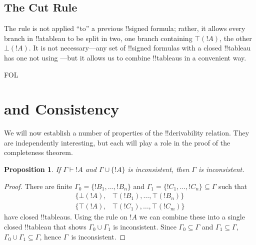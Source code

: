 \documentclass[10pt,a4paper]{article}
\theoremstyle{plain}
\newtheorem{prop}[thm]{Proposition}
\theoremstyle{definition}
\theoremstyle{remark}
\newcommand*{\olfileid}[3]{}
\newcommand*{\olsection}[1]{\section*{#1}}
\newcommand*{\ollabel}[1]{\label{#1}}
\providecommand{\AxiomC}[1]{}
\providecommand{\UnaryInfC}[1]{}
\providecommand{\RightLabel}[1]{}
\providecommand{\noLine}{}
\providecommand{\DisplayProof}{}
\providecommand{\lif}{\mathbin{\rightarrow}}
\providecommand{\Proves}{\mathrel{\vdash}}
\providecommand{\sFmla}[2]{#1(#2)}
\providecommand{\True}{\top}
\providecommand{\False}{\bot}
\providecommand{\iftag}[1]{#1}
\providecommand{\TRule}[1]{}
\providecommand{\Cut}{\mathrm{Cut}}
\begin{document}
\begin{defish}
\AxiomC{\sFmla{\True}{!A \lif !B}}
\RightLabel{\TRule{\True}{\lif}}
\UnaryInfC{$\sFmla{\False}{!A} \quad \mid \quad \sFmla{\True}{!B}$}
\DisplayProof
\hfill
\AxiomC{\sFmla{\False}{!A \lif !B}}
\RightLabel{\TRule{\False}{\lif}}
\UnaryInfC{\sFmla{\True}{!A}}
\noLine
\UnaryInfC{\sFmla{\False}{!B}}
\DisplayProof
\end{defish}

\subsection{The Cut Rule}

\begin{defish}
\AxiomC{}
\RightLabel{\Cut}
\UnaryInfC{$\sFmla{\True}{!A} \quad \mid \quad \sFmla{\False}{!A}$}
\DisplayProof
\end{defish}

The \Cut{} rule is not applied ``to'' a previous !!{signed formula}; rather,
it allows every branch in !!a{tableau} to be split in two, one branch
containing $\sFmla{\True}{!A}$, the other~$\sFmla{\False}{!A}$. It is
not necessary---any set of !!{signed formula}s with a closed
!!{tableau} has one not using \Cut---but it allows us to combine
!!{tableau}s in a convenient way.





\iftag{FOL}
      {\olfileid{fol}{tab}{prv}}
      {\olfileid{pl}{tab}{prv}}

\olsection{ and Consistency}

We will now establish a number of properties of the !!{derivability}
relation.  They are independently interesting, but each will play a
role in the proof of the completeness theorem.

\begin{prop}\ollabel{prop:provability-contr}
  If $\Gamma \Proves !A$ and $\Gamma \cup \{!A\}$ is
  inconsistent, then $\Gamma$ is inconsistent.
\end{prop}

\begin{proof}
There are finite $\Gamma_0 = \{!B_1, \dots, !B_n\}$ and $\Gamma_1
  =\{!C_1, \dots, !C_n\} \subseteq \Gamma$ such that
  \begin{align*}
    \{\sFmla{\False}{!A}, &
    \sFmla{\True}{!B_1}, \dots, \sFmla{\True}{!B_n}\} \\
    \{\sFmla{\True}{!A}, &
    \sFmla{\True}{!C_1}, \dots, \sFmla{\True}{!C_m}\}
  \end{align*}
  have closed !!{tableau}s.  Using the \Cut{} rule on $!A$ we can
  combine these into a single closed !!{tableau} that shows $\Gamma_0
  \cup \Gamma_1$ is inconsistent.  Since $\Gamma_0
  \subseteq \Gamma$ and $\Gamma_1 \subseteq \Gamma$, $\Gamma_0 \cup
  \Gamma_1 \subseteq \Gamma$, hence $\Gamma$~is inconsistent.
\end{proof}
\end{document}
